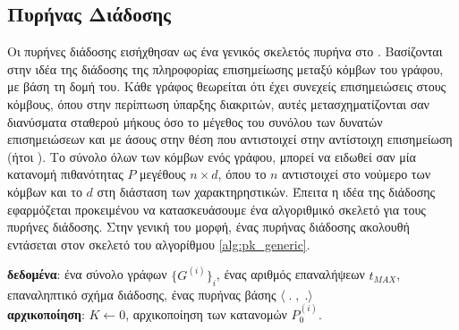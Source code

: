 \subsection{Πυρήνας Διάδοσης}
Οι πυρήνες διάδοσης εισήχθησαν ως ένα γενικός σκελετός πυρήνα στο \cite{Neumann2016}.
Βασίζονται στην ιδέα της διάδοσης της πληροφορίας επισημείωσης μεταξύ κόμβων του γράφου, με βάση τη δομή του.
Κάθε γράφος θεωρείται ότι έχει συνεχείς επισημειώσεις στους κόμβους, όπου στην περίπτωση ύπαρξης διακριτών, αυτές μετασχηματίζονται σαν διανύσματα σταθερού μήκους όσο το μέγεθος του συνόλου των δυνατών επισημειώσεων και με άσους στην θέση που αντιστοιχεί στην αντίστοιχη επισημείωση (ήτοι ).
Το σύνολο όλων των κόμβων ενός γράφου, μπορεί να ειδωθεί σαν μία κατανομή πιθανότητας $P$ μεγέθους $n \times d$, όπου το $n$ αντιστοιχεί στο νούμερο των κόμβων και το $d$ στη διάσταση των χαρακτηρηστικών.
Έπειτα η ιδέα της διάδοσης εφαρμόζεται προκειμένου να κατασκευάσουμε ένα αλγοριθμικό σκελετό για τους πυρήνες διάδοσης.
Στην γενική του μορφή, ένας πυρήνας διάδοσης ακολουθή εντάσεται στον σκελετό του αλγορίθμου \ref{alg:pk_generic}.
\begin{algorithm}[]
\textbf{δεδομένα}: ένα σύνολο γράφων $\{G^{(i)}\}_{i}$, ένας αριθμός επαναλήψεων $t_{MAX}$, επαναληπτικό σχήμα διάδοσης, ένας πυρήνας βάσης $\langle\;.\;,\;. \rangle$
\\
\textbf{αρχικοποίηση}: $K \leftarrow 0$, αρχικοποίηση των κατανομών $P_{0}^{(i)}$.

\caption{}
\label{alg:pk_generic}
\end{algorithm}

